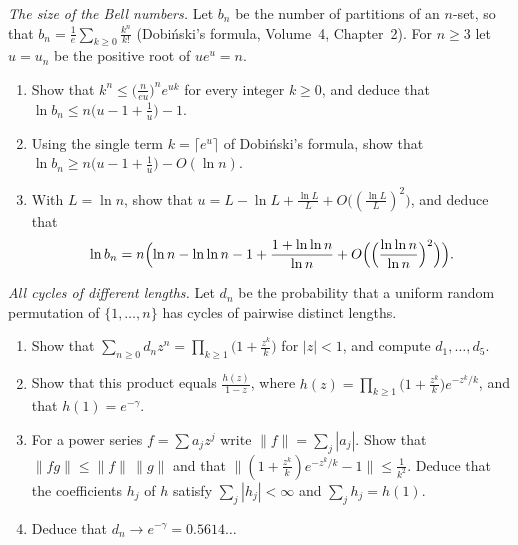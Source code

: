 \begin{exercise}[$\star\star\star$]\label{pb:bellasym}
\emph{The size of the Bell numbers.} Let $b_n$ be the number of partitions of an $n$-set, so that $b_n=\frac1e\sum_{k\ge0}\frac{k^n}{k!}$ (Dobi\'nski's
formula, Volume~4, Chapter~2). For $n\ge3$ let $u=u_n$ be the positive root of $ue^u=n$.
\begin{enumerate}[label=(\alph*)]
\item Show that $k^n\le\bigl(\frac n{eu}\bigr)^ne^{uk}$ for every integer $k\ge0$, and deduce that $\ln b_n\le n\bigl(u-1+\frac1u\bigr)-1$.
\item Using the single term $k=\lceil e^u\rceil$ of Dobi\'nski's formula, show that $\ln b_n\ge n\bigl(u-1+\frac1u\bigr)-O(\ln n)$.
\item With $L=\ln n$, show that $u=L-\ln L+\frac{\ln L}L+O\bigl((\frac{\ln L}L)^2\bigr)$, and deduce that
\[
\ln b_n=n\Bigl(\ln n-\ln\ln n-1+\frac{1+\ln\ln n}{\ln n}+O\Bigl(\Bigl(\frac{\ln\ln n}{\ln n}\Bigr)^2\Bigr)\Bigr).
\]
\end{enumerate}
\end{exercise}

\begin{exercise}[$\star\star\star$]\label{pb:distinctcycles}
\emph{All cycles of different lengths.} Let $d_n$ be the probability that a uniform random permutation of $\{1,\dots,n\}$ has cycles of pairwise distinct lengths.
\begin{enumerate}[label=(\alph*)]
\item Show that $\sum_{n\ge0}d_nz^n=\prod_{k\ge1}\bigl(1+\frac{z^k}k\bigr)$ for $|z|<1$, and compute $d_1,\dots,d_5$.
\item Show that this product equals $\frac{h(z)}{1-z}$, where $h(z)=\prod_{k\ge1}\bigl(1+\frac{z^k}k\bigr)e^{-z^k/k}$, and that $h(1)=e^{-\gamma}$.
\item For a power series $f=\sum a_jz^j$ write $\|f\|=\sum_j|a_j|$. Show that $\|fg\|\le\|f\|\,\|g\|$ and that $\bigl\|(1+\frac{z^k}k)e^{-z^k/k}-1\bigr\|\le\frac1{k^2}$.
Deduce that the coefficients $h_j$ of $h$ satisfy $\sum_j|h_j|<\infty$ and $\sum_jh_j=h(1)$.
\item Deduce that $d_n\to e^{-\gamma}=0.5614\ldots$
\end{enumerate}
\end{exercise}

